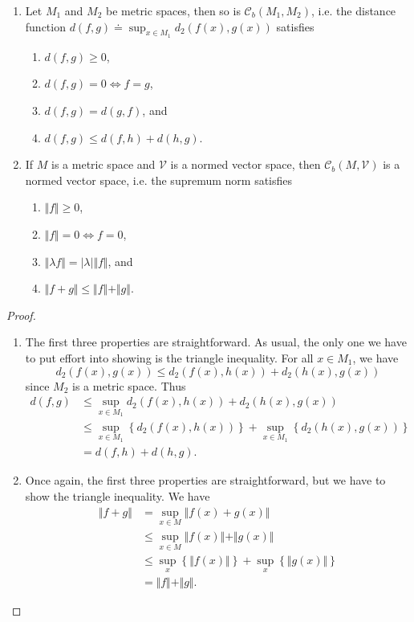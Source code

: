 \documentclass[10pt]{report}
\begin{document}
\begin{thrm}{}{}
\begin{enumerate}
	\item Let $M_1$ and $M_2$ be metric spaces, then so is $\mathcal{C}_b(M_1,M_2)$, i.e. the distance function $d(f,g) \doteq \sup_{x\in M_1} d_2(f(x), g(x))$ satisfies
		\begin{enumerate}
			\item $d(f,g) \geq 0$,
			\item $d(f,g) = 0 \iff f=g$,
			\item $d(f,g) = d(g,f)$, and
			\item $d(f,g) \leq d(f,h) + d(h,g)$.
		\end{enumerate}

	\item If $M$ is a metric space and $\mathcal{V}$ is a normed vector space, then $\mathcal{C}_b(M,\mathcal{V})$ is a normed vector space, i.e. the supremum norm satisfies
		\begin{enumerate}
			\item $\Vert{f}\Vert\geq 0$,
			\item $\Vert{f}\Vert=0 \iff f=0$,
			\item $\Vert{\lambda f}\Vert = |\lambda| \Vert{f}\Vert$, and
			\item $\Vert{f+g}\Vert\leq \Vert{f}\Vert+\Vert{g}\Vert$.
		\end{enumerate}
\end{enumerate}
\end{thrm}
\begin{proof}
	\begin{enumerate}
		\item The first three properties are straightforward. As usual, the only one we have to put effort into showing is the triangle inequality. For all $x \in M_1$, we have
			\[
				d_2(f(x), g(x)) \leq d_2(f(x), h(x)) + d_2(h(x), g(x))
			\] since $M_2$ is a metric space. Thus
			\begin{align*}
				d(f,g) &\leq \sup_{x \in M_1}d_2(f(x), h(x)) + d_2(h(x), g(x)) \\
				&\leq \sup_{x \in M_1}\left\{d_2(f(x), h(x))\right\} + \sup_{x \in M_1}\left\{d_2(h(x), g(x))\right\} \\
				&= d(f,h) + d(h,g).
			\end{align*}

		\item Once again, the first three properties are straightforward, but we have to show the triangle inequality. We have
			\begin{align*}
				\Vert{f+g}\Vert &= \sup_{x \in M}\Vert{f(x)+g(x)}\Vert \\
						&\leq \sup_{x \in M}\Vert{f(x)}\Vert+ \Vert{g(x)}\Vert \\
						&\leq \sup_{x}\left\{\Vert{f(x)}\Vert\right\}+ \sup_x \left\{\Vert{g(x)}\Vert\right\} \\
						&= \Vert{f}\Vert+ \Vert{g}\Vert.
			\end{align*}
	\end{enumerate}
\end{proof}
\end{document}

